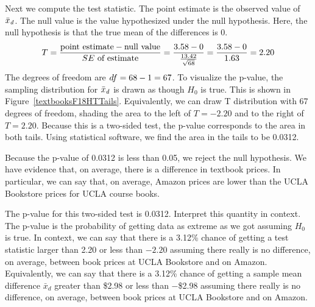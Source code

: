 Next we compute the test statistic.  The point estimate is the observed value of $\bar{x}_{\text{\emph{d}}}$.  The null value is the value hypothesized under the null hypothesis.  Here, the null hypothesis is that the true mean of the differences is 0.  
\begin{align*}
T
  = \frac{\text{point estimate} - \text{null value}}
      {SE \text{ of estimate}} =  \frac{3.58{} - 0}{\frac{13.42{}}{\sqrt{68{}}}}
  = \frac{3.58{} - 0}{1.63{}} = 2.20
\end{align*}
The degrees of freedom are $df = 68{} - 1 = 67$.
To visualize the p-value, the sampling distribution
for $\bar{x}_{\text{\emph{d}}}$ is drawn as though
$H_0$ is true.  This is shown in
Figure~\ref{textbooksF18HTTails}.  Equivalently, we can draw T distribution with 67 degrees of freedom, shading the area to the left of $T=-2.20$ and to the right of $T=2.20$.  Because this is a two-sided test, the p-value corresponds to the area in both tails.  Using statistical software, we find the area in the tails to be 0.0312.

Because the p-value of 0.0312 is less than 0.05,
we reject the null hypothesis.  We have evidence that, on average, there is a difference in textbook prices.  In particular, we can say that, on average, Amazon prices are lower than the
UCLA Bookstore prices for UCLA course books.


\begin{examplewrap}
\begin{nexample}{The p-value for this two-sided test is 0.0312.  Interpret this quantity in context.  }
The p-value is the probability of getting data as extreme as we got assuming $H_0$ is true.  In context, we can say that there is a 3.12\% chance of getting a test statistic larger than 2.20 or less than $-2.20$ assuming there really is no difference, on average, between book prices at UCLA Bookstore and on Amazon.  Equivalently, we can say that there is a 3.12\% chance of getting a sample mean difference $\bar{x}_{d}$ greater than \$2.98 or less than $-$\$2.98 assuming there really is no difference, on average, between book prices at UCLA Bookstore and on Amazon.
\end{nexample}
\end{examplewrap}

